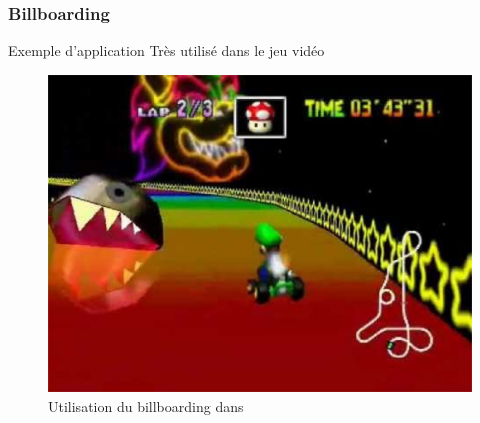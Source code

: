 \documentclass[handout]{beamer}
\begin{document}
\begin{frame}
  \frametitle{Billboarding}
  \begin{block}{Exemple d'application}
    Très utilisé dans le jeu vidéo
  \end{block}

  \begin{figure}[ht]
    \begin{center}
      \includegraphics[scale=0.3]{contents/mk64}
    \end{center}
    \caption{Utilisation du billboarding dans }
    \label{fig:mk64}
  \end{figure}
\end{frame}
\end{document}
